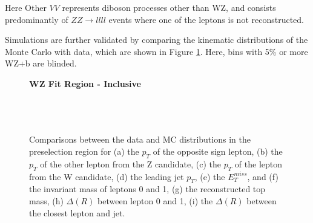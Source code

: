 Here Other $VV$ represents diboson processes other than WZ, and consists predominantly of $ZZ\rightarrow llll$ events where one of the leptons is not reconstructed.

Simulations are further validated by comparing the kinematic distributions of the Monte Carlo with data, which are shown in Figure \ref{kin:inclusive}. Here, bins with 5\% or more WZ+b are blinded.


\begin{figure}[H] 
    \centering
    \textbf{WZ Fit Region - Inclusive}\\
    \\      
    \\
    \\
    \caption{Comparisons between the data and MC distributions in the preselection region for (a) the $p_T$ of the opposite sign lepton, (b) the $p_T$ of the other lepton from the Z candidate, (c) the $p_T$ of the lepton from the W candidate, (d) the leading jet $p_T$, (e) the $E_T^{miss}$, and (f) the invariant mass of leptons 0 and 1, (g) the reconstructed top mass, (h) $\Delta(R)$  between lepton 0 and 1, (i) the $\Delta(R)$ between the closest lepton and jet.}
    \label{kin:inclusive}
\end{figure}

